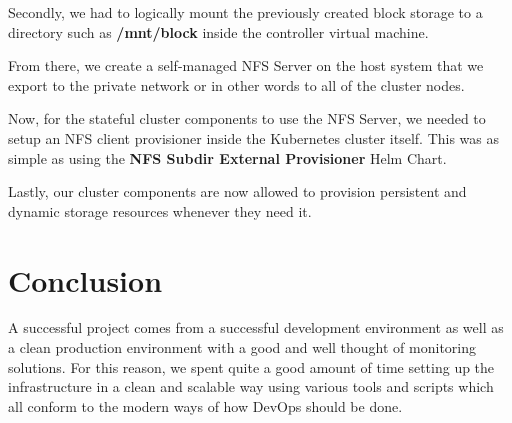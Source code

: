 Secondly, we had to logically mount the previously created block storage to a directory such as \textbf{/mnt/block} inside the controller virtual machine.

From there, we create a self-managed NFS Server on the host system that we export to the private network or in other words to all of the cluster nodes.

Now, for the stateful cluster components to use the NFS Server, we needed to setup an NFS client provisioner inside the Kubernetes cluster itself. This was as simple as using the \textbf{NFS Subdir External Provisioner} Helm Chart.

Lastly, our cluster components are now allowed to provision persistent and dynamic storage resources whenever they need it.

\setcounter{secnumdepth}{0} %
\section{Conclusion}
A successful project comes from a successful development environment as well as a clean production environment with a good and well thought of monitoring solutions.
For this reason, we spent quite a good amount of time setting up the infrastructure in a clean and scalable way using various tools and scripts which all conform to the modern ways of how DevOps should be done.
